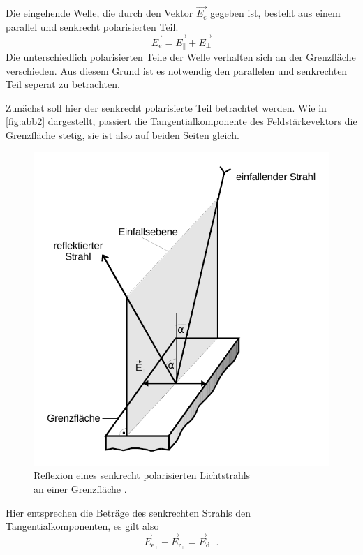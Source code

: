 Die eingehende Welle, die durch den Vektor $\vec{E_e}$ gegeben ist, besteht aus einem parallel und senkrecht polarisierten Teil.
\begin{equation*}
    \vec{E_e} = \vec{E_\parallel}  + \vec{E_\perp}
    \label{eq:vier}
\end{equation*}
Die unterschiedlich polarisierten Teile der Welle verhalten sich an der Grenzfläche verschieden.
Aus diesem Grund ist es notwendig den parallelen und senkrechten Teil seperat zu betrachten.\\

\newpage

Zunächst soll hier der senkrecht polarisierte Teil betrachtet werden.
Wie in \autoref{fig:abb2} dargestellt, passiert die Tangentialkomponente des Feldstärkevektors die Grenzfläche stetig, sie ist also auf beiden Seiten gleich.

\begin{figure}[H]
    \centering
    \includegraphics{Brechung mit senkrechter Strahlung.pdf}
    \caption{Reflexion eines senkrecht polarisierten Lichtstrahls \\ an einer Grenzfläche \cite{ap01}.}
    \label{fig:abb2}
\end{figure}

Hier entsprechen die Beträge des senkrechten Strahls den Tangentialkomponenten, es gilt also
\begin{equation}
    \vec{E}_{\text{e}_{\perp}} + \vec{E}_{\text{r}_{\perp}} = \vec{E}_{\text{d}_{\perp}} \,.
    \label{eq:esenkrecht}
\end{equation}

